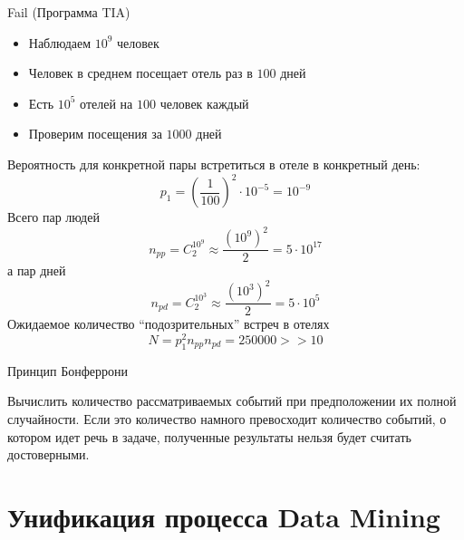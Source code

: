 \documentclass[10pt]{beamer}
\begin{document}
\begin{frame}{Fail (Программа TIA)}

\begin{itemize}
\item Наблюдаем $10^9$ человек
\item Человек в среднем посещает отель раз в $100$ дней
\item Есть $10^5$ отелей на $100$ человек каждый
\item Проверим посещения за $1000$ дней 
\end{itemize}

Вероятность для конкретной пары встретиться в отеле в конкретный день:
\[
p_1 = \left(\frac{1}{100}\right)^2 \cdot 10^{-5} = 10^{-9}
\]
Всего пар людей
\[
n_{pp} = C^{10^9}_2 \approx \frac{(10^9)^2}{2} = 5 \cdot 10^{17}
\]
а пар дней
\[
n_{pd} = C^{10^3}_2 \approx \frac{(10^3)^2}{2} = 5 \cdot 10^{5}
\]
Ожидаемое количество ``подозрительных'' встреч в отелях
\[
N = p_1^2 n_{pp} n_{pd} = 250000 >> 10
\]

\end{frame}

\begin{frame}{Принцип Бонферрони}

Вычислить количество рассматриваемых событий при предположении их полной случайности. Если это количество намного превосходит количество событий, о котором идет речь в задаче, полученные результаты нельзя будет считать достоверными.

\end{frame}

\section{Унификация процесса Data Mining}
\end{document}
